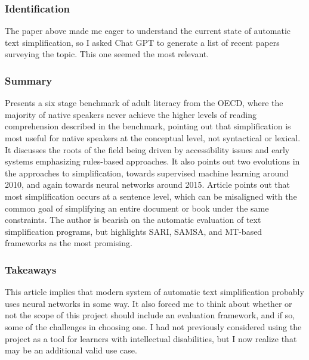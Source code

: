 \documentclass[
	letterpaper, %
]{jdf}
\begin{document}
\subsubsection{Identification}
The paper above made me eager to understand the current state of automatic text simplification, so I asked Chat GPT to generate a list of recent papers surveying the topic. This one seemed the most relevant.

\subsubsection{Summary}
Presents a six stage benchmark of adult literacy from the OECD, where the majority of native speakers never achieve the higher levels of reading comprehension described in the benchmark, pointing out that simplification is most useful for native speakers at the conceptual level, not syntactical or lexical. It discusses the roots of the field being driven by accessibility issues and early systems emphasizing rules-based approaches. It also points out two evolutions in the approaches to simplification, towards supervised machine learning around 2010, and again towards neural networks around 2015. Article points out that most simplification occurs at a sentence level, which can be misaligned with the common goal of simplifying an entire document or book under the same constraints. The author is bearish on the automatic evaluation of text simplification programs, but highlights SARI, SAMSA, and MT-based frameworks as the most promising.

\subsubsection{Takeaways}
This article implies that modern system of automatic text simplification probably uses neural networks in some way. It also forced me to think about whether or not the scope of this project should include an evaluation framework, and if so, some of the challenges in choosing one. I had not previously considered using the project as a tool for learners with intellectual disabilities, but I now realize that may be an additional valid use case.

\subsection{}
\end{document}
